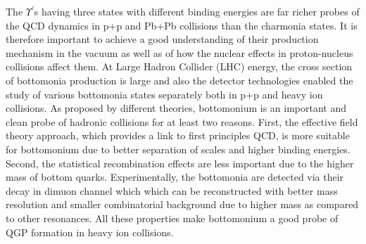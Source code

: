 The $\Upsilon^{'}$s having three states with different binding
energies are far richer probes of the QCD dynamics in p+p and Pb+Pb collisions than
the charmonia states.
It is therefore important to achieve a good understanding of their
production mechanism in the vacuum as well as of how the nuclear effects in proton-nucleus
collisions affect them.
  At Large Hadron Collider (LHC) energy, the cross section of bottomonia production
is large and also the detector technologies enabled the study of various bottomonia 
states separately both in p+p and heavy ion collisions.
As proposed by different theories, bottomonium is an important and clean probe 
of hadronic collisions for at least two reasons. 
First, the effective field theory approach, which provides a link to first 
principles QCD, is more suitable for bottomonium due to better separation of 
scales and higher binding energies. Second, the statistical recombination effects 
are less important due to the higher mass of bottom quarks.  
Experimentally, the bottomonia are detected via their decay in dimuon channel which
which can be reconstructed with better mass resolution and smaller
combinatorial background due to higher mass as compared to other resonances. 
 All these properties make bottomonium a good probe of 
QGP formation in heavy ion collisions.

